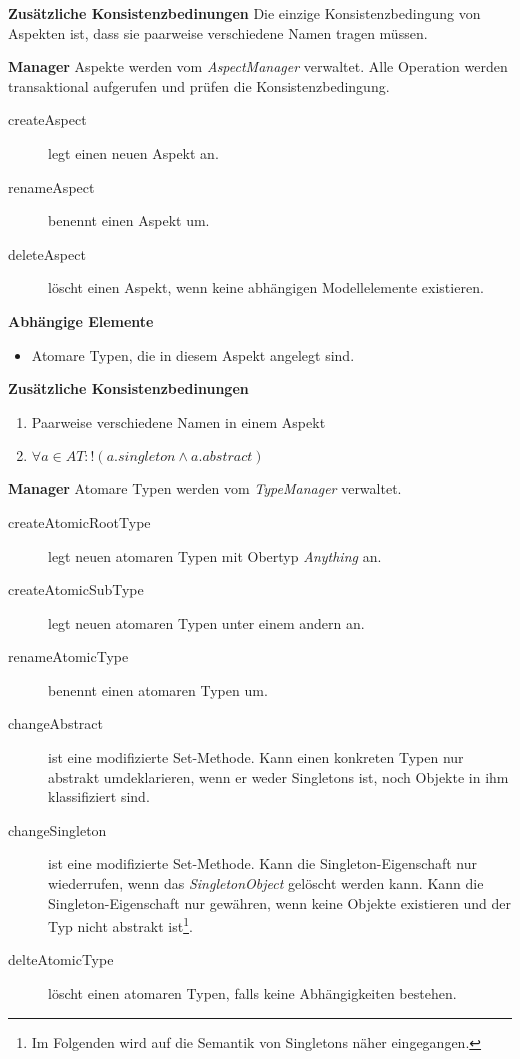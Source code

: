 
\textbf{Zusätzliche Konsistenzbedinungen} \newline
Die einzige Konsistenzbedingung von Aspekten ist, dass sie paarweise verschiedene Namen tragen müssen. 

\textbf{Manager} \newline
Aspekte werden vom \emph{AspectManager} verwaltet. Alle Operation werden transaktional aufgerufen und prüfen die Konsistenzbedingung. 

\begin{description}
\item[createAspect] legt einen neuen Aspekt an.
\item[renameAspect] benennt einen Aspekt um.
\item[deleteAspect] löscht einen Aspekt, wenn keine abhängigen Modellelemente existieren.
\end{description}

\textbf{Abhängige Elemente}
\begin{itemize}
	\item Atomare Typen, die in diesem Aspekt angelegt sind.
\end{itemize}

\newpage
{}

\textbf{Zusätzliche Konsistenzbedinungen}
\begin{enumerate}
  		\item Paarweise verschiedene Namen in einem Aspekt
  		\item \(\forall a \in AT : !(a.singleton \land a.abstract) \)
\end{enumerate}

\textbf{Manager} \newline
Atomare Typen werden vom \emph{TypeManager} verwaltet. 

\begin{description}
\item[createAtomicRootType] legt neuen atomaren Typen mit Obertyp \emph{Anything} an. 
\item[createAtomicSubType] legt neuen atomaren Typen unter einem andern an. 
\item[renameAtomicType] benennt einen atomaren Typen um. 
\item[changeAbstract] ist eine modifizierte Set-Methode. Kann einen konkreten Typen nur abstrakt umdeklarieren, wenn er weder Singletons ist, noch 
Objekte in ihm klassifiziert sind.
\item[changeSingleton] ist eine modifizierte Set-Methode. Kann die Singleton-Eigenschaft nur wiederrufen, wenn das \emph{SingletonObject} gelöscht werden kann. 
 Kann die Singleton-Eigenschaft nur gewähren, wenn keine Objekte existieren und der Typ nicht abstrakt ist\footnote{Im Folgenden wird auf die Semantik von Singletons näher eingegangen.}. 
 \item[delteAtomicType] löscht einen atomaren Typen, falls keine Abhängigkeiten bestehen.
\end{description}


